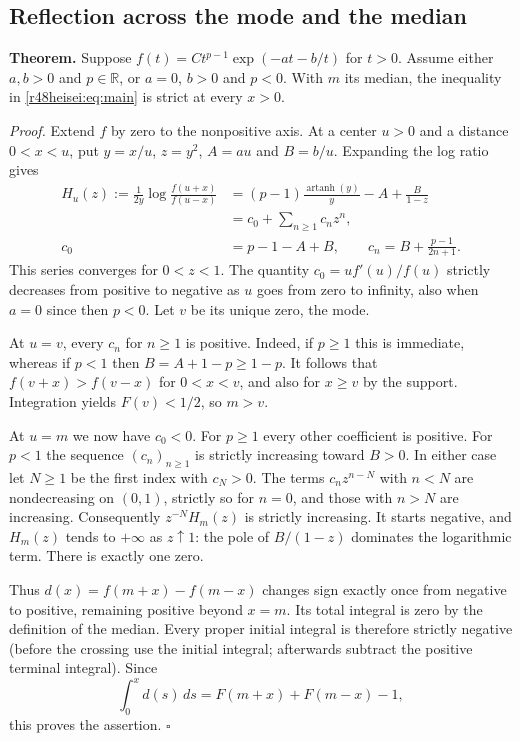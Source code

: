\documentclass[11pt,a4paper]{article}
\numberwithin{equation}{section}
\theoremstyle{definition}
\theoremstyle{remark}
\begin{document}
\subsection{Reflection across the mode and the median}
\textbf{Theorem.} Suppose $f(t)=C t^{p-1}\exp(-a t-b/t)$ for $t>0$. Assume either $a,b>0$ and $p\in\mathbb R$, or $a=0$, $b>0$ and $p<0$.
With $m$ its median, the inequality in \eqref{r48heisei:eq:main} is strict at every $x>0$.

\emph{Proof.} Extend $f$ by zero to the nonpositive axis. At a center $u>0$ and a distance $0<x<u$, put $y=x/u$, $z=y^2$, $A=au$ and $B=b/u$. Expanding the log ratio gives
\begin{align*}
 H_u(z):=\frac{1}{2y}\log\frac{f(u+x)}{f(u-x)}
 &= (p-1)\frac{\operatorname{artanh}(y)}{y}-A+\frac{B}{1-z}\\
 &=c_0+\sum_{n\ge1}c_nz^n,\\[-2pt]
 c_0&=p-1-A+B,\qquad c_n=B+\frac{p-1}{2n+1}.
\end{align*}
This series converges for $0<z<1$. The quantity $c_0=u f'(u)/f(u)$ strictly decreases from positive to negative as $u$ goes from zero to infinity, also when $a=0$ since then $p<0$. Let $v$ be its unique zero, the mode.

At $u=v$, every $c_n$ for $n\ge1$ is positive. Indeed, if $p\ge1$ this is immediate, whereas if $p<1$ then $B=A+1-p\ge1-p$. It follows that $f(v+x)>f(v-x)$ for $0<x<v$, and also for $x\ge v$ by the support. Integration yields $F(v)<1/2$, so $m>v$.

At $u=m$ we now have $c_0<0$. For $p\ge1$ every other coefficient is positive. For $p<1$ the sequence $(c_n)_{n\ge1}$ is strictly increasing toward $B>0$. In either case let $N\ge1$ be the first index with $c_N>0$. The terms $c_nz^{n-N}$ with $n<N$ are nondecreasing on $(0,1)$, strictly so for $n=0$, and those with $n>N$ are increasing. Consequently $z^{-N}H_m(z)$ is strictly increasing. It starts negative, and $H_m(z)$ tends to $+\infty$ as $z\uparrow1$: the pole of $B/(1-z)$ dominates the logarithmic term. There is exactly one zero.

Thus $d(x)=f(m+x)-f(m-x)$ changes sign exactly once from negative to positive, remaining positive beyond $x=m$. Its total integral is zero by the definition of the median. Every proper initial integral is therefore strictly negative (before the crossing use the initial integral; afterwards subtract the positive terminal integral). Since
\[
 \int_0^x d(s)\,ds=F(m+x)+F(m-x)-1,
\]
this proves the assertion. \hfill$\square$
\end{document}
